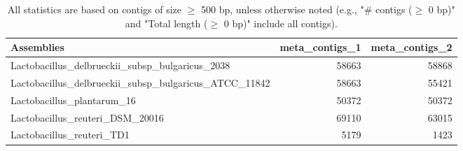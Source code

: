 \documentclass[12pt,a4paper]{article}
\begin{document}
\begin{table}[ht]
\begin{center}
\caption{All statistics are based on contigs of size $\geq$ 500 bp, unless otherwise noted (e.g., "\# contigs ($\geq$ 0 bp)" and "Total length ($\geq$ 0 bp)" include all contigs).}
\begin{tabular}{|l*{2}{|r}|}
\hline
Assemblies & meta\_contigs\_1 & meta\_contigs\_2 \\ \hline
Lactobacillus\_delbrueckii\_subsp\_bulgaricus\_2038 & 58663 & 58868 \\ \hline
Lactobacillus\_delbrueckii\_subsp\_bulgaricus\_ATCC\_11842 & 58663 & 55421 \\ \hline
Lactobacillus\_plantarum\_16 & 50372 & 50372 \\ \hline
Lactobacillus\_reuteri\_DSM\_20016 & 69110 & 63015 \\ \hline
Lactobacillus\_reuteri\_TD1 & 5179 & 1423 \\ \hline
\end{tabular}
\end{center}
\end{table}
\end{document}
